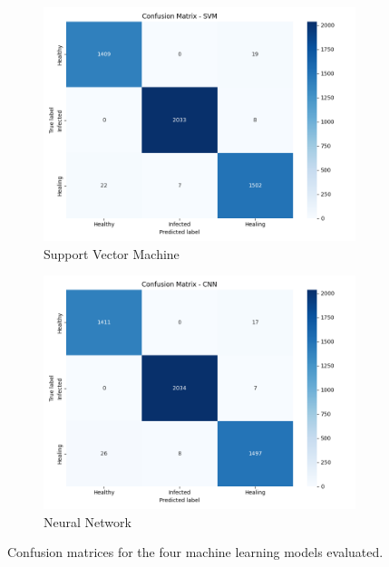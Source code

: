 \documentclass[conference]{IEEEtran}
\begin{document}
\begin{figure}[H]
    \begin{subfigure}[b]{0.45\textwidth}
        \includegraphics[width=\textwidth]{figures/confusion_matrix_SVM.png}
        \caption{Support Vector Machine}
        \label{fig:cm_svm}
    \end{subfigure}
    \begin{subfigure}[b]{0.45\textwidth}
        \includegraphics[width=\textwidth]{figures/confusion_matrix_CNN.png}
        \caption{Neural Network}
        \label{fig:cm_cnn}
    \end{subfigure}
    \caption{Confusion matrices for the four machine learning models evaluated.}
    \label{fig:confusion_matrices}
\end{figure}
\end{document}
